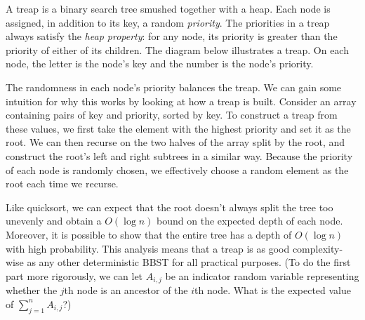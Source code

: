 A treap is a binary search tree smushed together with a heap. Each node is assigned, in addition to its key, a random \emph{priority}. The priorities in a treap always satisfy the \emph{heap property}: for any node, its priority is greater than the priority of either of its children. The diagram below illustrates a treap. On each node, the letter is the node's key and the number is the node's priority.

\begin{center}
\end{center}

The randomness in each node's priority balances the treap. We can gain some intuition for why this works by looking at how a treap is built. Consider an array containing pairs of key and priority, sorted by key. To construct a treap from these values, we first take the element with the highest priority and set it as the root. We can then recurse on the two halves of the array split by the root, and construct the root's left and right subtrees in a similar way. Because the priority of each node is randomly chosen, we effectively choose a random element as the root each time we recurse.

Like quicksort, we can expect that the root doesn't always split the tree too unevenly and obtain a $O(\log n)$ bound on the expected depth of each node. Moreover, it is possible to show that the entire tree has a depth of $O(\log n)$ with high probability. This analysis means that a treap is as good complexity-wise as any other deterministic BBST for all practical purposes. (To do the first part more rigorously, we can let $A_{i,j}$ be an indicator random variable representing whether the $j$th node is an ancestor of the $i$th node. What is the expected value of $\sum_{j=1}^n A_{i,j}$?) 

